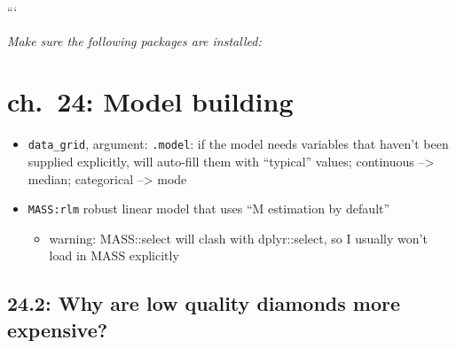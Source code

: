 \documentclass[]{book}
\newenvironment{Shaded}{\begin{snugshade}}{\end{snugshade}}
\newcommand{\DataTypeTok}[1]{\textcolor[rgb]{0.13,0.29,0.53}{#1}}
\newcommand{\KeywordTok}[1]{\textcolor[rgb]{0.13,0.29,0.53}{\textbf{#1}}}
\newcommand{\NormalTok}[1]{#1}
\newcommand{\OperatorTok}[1]{\textcolor[rgb]{0.81,0.36,0.00}{\textbf{#1}}}
\newcommand{\OtherTok}[1]{\textcolor[rgb]{0.56,0.35,0.01}{#1}}
\providecommand{\tightlist}{%
  \setlength{\itemsep}{0pt}\setlength{\parskip}{0pt}}
\theoremstyle{definition}
\theoremstyle{definition}
\theoremstyle{definition}
\theoremstyle{remark}
\begin{document}
```

\begin{Shaded}
\end{Shaded}

\emph{Make sure the following packages are installed:}

\hypertarget{ch.-24-model-building}{%
\chapter{ch.~24: Model building}\label{ch.-24-model-building}}

\begin{itemize}
\tightlist
\item
  \texttt{data\_grid}, argument: \texttt{.model}: if the model needs
  variables that haven't been supplied explicitly, will auto-fill them
  with ``typical'' values; continuous --\textgreater{} median;
  categorical --\textgreater{} mode
\item
  \texttt{MASS:rlm} robust linear model that uses ``M estimation by
  default''

  \begin{itemize}
  \tightlist
  \item
    warning: MASS::select will clash with dplyr::select, so I usually
    won't load in MASS explicitly
  \end{itemize}
\end{itemize}

\hypertarget{why-are-low-quality-diamonds-more-expensive}{%
\section{24.2: Why are low quality diamonds more
expensive?}\label{why-are-low-quality-diamonds-more-expensive}}
\end{document}
